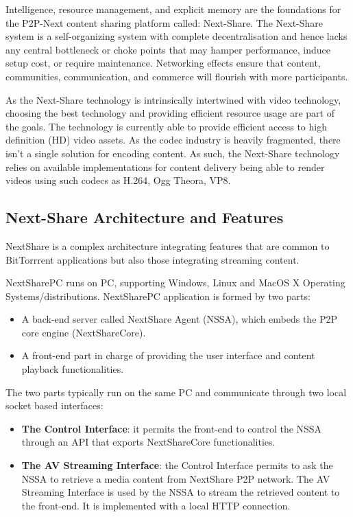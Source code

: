 Intelligence, resource management, and explicit memory are the foundations for
the P2P-Next content sharing platform called: Next-Share. The Next-Share
system is a self-organizing system with complete decentralisation and hence
lacks any central bottleneck or choke points that may hamper performance,
induce setup cost, or require maintenance. Networking effects ensure that
content, communities, communication, and commerce will flourish with more
participants.

As the Next-Share technology is intrinsically intertwined with video technology,
choosing the best technology and providing efficient resource usage are part
of the goals. The technology is currently able to provide efficient access to
high definition (HD) video assets. As the codec industry is heavily
fragmented, there isn't a single solution for encoding content. As such, the
Next-Share technology relies on available implementations for content delivery
being able to render videos using such codecs as H.264, Ogg Theora, VP8.

\subsection{Next-Share Architecture and Features}
\label{subsec:multimedia-dist:nextshare-arch}

NextShare is a complex architecture integrating features that are common to
BitTorrrent applications but also those integrating streaming content.

NextSharePC runs on PC, supporting Windows, Linux and MacOS X Operating
Systems/distributions. NextSharePC application is formed by two parts:
\begin{itemize}
  \item A back-end server called NextShare Agent (NSSA), which embeds the P2P
  core engine (NextShareCore).
  \item A front-end part in charge of providing the user interface and content
  playback functionalities.
\end{itemize}

The two parts typically run on the same PC and communicate through two local
socket based interfaces:
\begin{itemize}
  \item \textbf{The Control Interface}: it permits the front-end to control
  the NSSA through an API that exports NextShareCore functionalities.
  \item \textbf{The AV Streaming Interface}: the Control Interface permits to
  ask the NSSA to retrieve a media content from NextShare P2P network. The AV
  Streaming Interface is used by the NSSA to stream the retrieved content to
  the front-end. It is implemented with a local HTTP connection.
\end{itemize}

